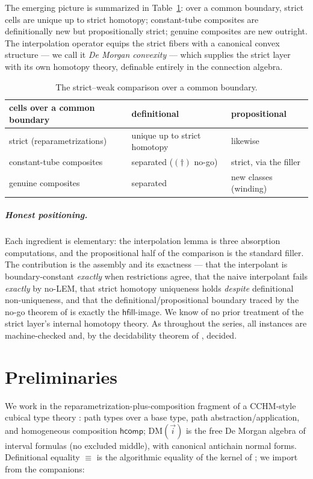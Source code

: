 \documentclass[11pt]{amsart}
\theoremstyle{definition}
\newcommand{\DM}[1]{\mathrm{DM}(#1)}
\newcommand{\aconv}{\equiv}
\newcommand{\hcomp}{\mathsf{hcomp}}
\newcommand{\hfillop}{\mathsf{hfill}}
\begin{document}
The emerging picture is summarized in
Table~\ref{tab:comparison}: over a common boundary, strict cells
are unique up to strict homotopy; constant-tube composites are
definitionally new but propositionally strict; genuine composites
are new outright.  The interpolation operator equips the strict
fibers with a canonical convex structure --- we call it \emph{De
Morgan convexity} --- which supplies the strict layer with its own
homotopy theory, definable entirely in the connection algebra.

\begin{table}
  \centering
  \footnotesize
  \begin{tabular}{lll}
    cells over a common boundary & definitional & propositional \\
    \hline
    strict (reparametrizations) &
      unique up to strict homotopy &
      likewise \\
    constant-tube composites &
      separated ($(\dagger)$ no-go) &
      strict, via the filler \\
    genuine composites &
      separated &
      new classes (winding) \\
  \end{tabular}
  \medskip
  \caption{The strict--weak comparison over a common boundary.}
  \label{tab:comparison}
\end{table}

\subparagraph*{Honest positioning.}  Each ingredient is elementary:
the interpolation lemma is three absorption computations, and the
propositional half of the comparison is the standard filler.  The
contribution is the assembly and its exactness --- that the
interpolant is boundary-constant \emph{exactly} when restrictions
agree, that the naive interpolant fails \emph{exactly} by no-LEM,
that strict homotopy uniqueness holds \emph{despite} definitional
non-uniqueness, and that the definitional/propositional boundary
traced by the no-go theorem of \cite{Const} is exactly the
$\hfillop$-image.  We know of no prior treatment of the strict
layer's internal homotopy theory.  As throughout the series, all
instances are machine-checked and, by the decidability theorem of
\cite{Const}, decided.

\section{Preliminaries}
\label{sec:prelim}

We work in the reparametrization-plus-composition fragment of a
CCHM-style cubical type theory \cite{CCHM}: path types over a base
type, path abstraction/application, and homogeneous composition
$\hcomp$; $\DM{\vec i}$ is the free De Morgan algebra of interval
formulas (no excluded middle), with canonical antichain normal
forms.  Definitional equality $\aconv$ is the algorithmic equality
of the kernel of \cite{Const}; we import from the companions:
\end{document}
